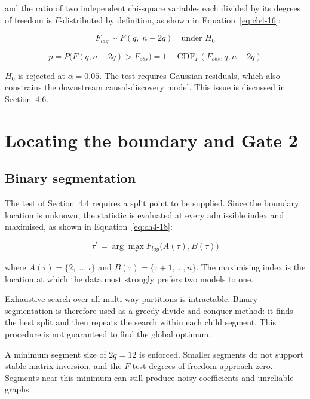 and the ratio of two independent chi-square variables each divided by its degrees of
freedom is $F$-distributed by definition, as shown in Equation~\eqref{eq:ch4-16}:

\begin{equation}
    \label{eq:ch4-16}
F_{lag} \sim F(q,\; n-2q) \quad \text{under } H_0
\end{equation}

\begin{equation}
    \label{eq:ch4-17}
p = P\big(F(q, n-2q) > F_{obs}\big) = 1 - \mathrm{CDF}_F(F_{obs}, q, n-2q)
\end{equation}

$H_0$ is rejected at $\alpha=0.05$. The test requires Gaussian residuals, which also
constrains the downstream causal-discovery model. This issue is discussed in
Section~4.6.


\section{Locating the boundary and Gate 2}


\subsection{Binary segmentation}

The test of Section~4.4 requires a split point to be supplied. Since the boundary location is
unknown, the statistic is evaluated at every admissible index and maximised, as shown
in Equation~\eqref{eq:ch4-18}:

\begin{equation}
    \label{eq:ch4-18}
\tau^* = \arg\max_{\tau} F_{lag}\big(A(\tau), B(\tau)\big)
\end{equation}

where $A(\tau) = \{2,\ldots,\tau\}$ and $B(\tau) = \{\tau+1,\ldots,n\}$. The maximising
index is the location at which the data most strongly prefers two models to one.

Exhaustive search over all multi-way partitions is intractable. Binary segmentation
is therefore used as a greedy divide-and-conquer method: it finds the best split and
then repeats the search within each child segment. This procedure is not guaranteed
to find the global optimum.

A minimum segment size of $2q=12$ is enforced. Smaller segments do not support
stable matrix inversion, and the $F$-test degrees of freedom approach zero. Segments
near this minimum can still produce noisy coefficients and unreliable graphs.

